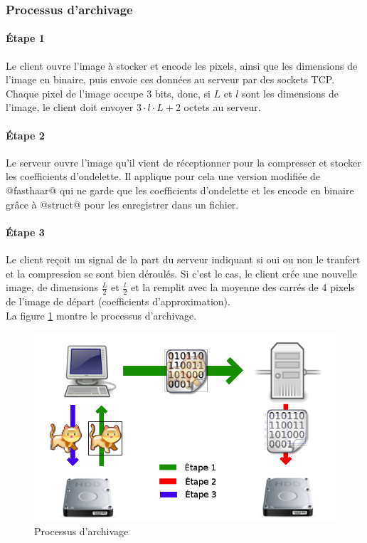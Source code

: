 \documentclass{article}
\begin{document}
\subsubsection{Processus d'archivage}

\paragraph{Étape 1}

Le client ouvre l'image à stocker et encode les pixels, ainsi que les dimensions de l'image en binaire, puis envoie ces données au serveur par des sockets TCP. Chaque pixel de l'image occupe 3 bits, donc, si $L$ et $l$ sont les dimensions de l'image, le client doit envoyer $3\cdot{}l\cdot{}L + 2$ octets au serveur.

\paragraph{Étape 2}

Le serveur ouvre l'image qu'il vient de réceptionner pour la compresser et stocker les coefficients d'ondelette. Il applique pour cela une version modifiée de @fasthaar@ qui ne garde que les coefficients d'ondelette et les encode en binaire grâce à @struct@ pour les enregistrer dans un fichier.

\paragraph{Étape 3}

Le client reçoit un signal de la part du serveur indiquant si oui ou non le tranfert et la compression se sont bien déroulés. Si c'est le cas, le client crée une nouvelle image, de dimensions $\frac{L}{2}$ et $\frac{l}{2}$ et la remplit avec la moyenne des carrés de 4 pixels de l'image de départ (coefficients d'approximation). \\


La figure \ref{save} montre le processus d'archivage.

\begin{figure}[!h]
\centering
\includegraphics[scale=0.5]{images/save.png}
\caption{Processus d'archivage}
\label{save}
\end{figure}
\end{document}
